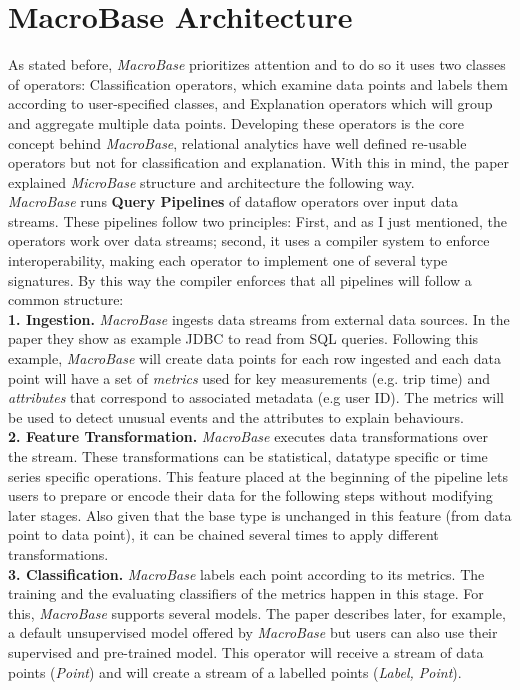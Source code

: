 \documentclass[11pt, titlepage]{article}
\begin{document}
	\section{MacroBase Architecture}
	\begin{flushleft}
		As stated before, \textit{MacroBase} prioritizes attention and to do so it uses two classes of operators: Classification operators, which examine data points and labels them according to user-specified classes, and Explanation operators which will group and aggregate multiple data points. Developing these operators is the core concept behind \textit{MacroBase}, relational analytics have well defined re-usable operators but not for classification and explanation. With this in mind, the paper explained \textit{MicroBase} structure and architecture the following way.
		\\\textit{MacroBase} runs \textbf{Query Pipelines} of dataflow operators over input data streams. These pipelines follow two principles: First, and as I just mentioned, the operators work over data streams; second, it uses a compiler system to enforce interoperability, making each operator to implement one of several type signatures. By this way the compiler enforces that all pipelines will follow a common structure:
		\\\textbf{1. Ingestion.} \textit{MacroBase} ingests data streams from external data sources. In the paper they show as example JDBC to read from SQL queries. Following this example, \textit{MacroBase} will create data points for each row ingested and each data point will have a set of \textit{metrics} used for key measurements (e.g. trip time) and \textit{attributes} that correspond to associated metadata (e.g user ID). The metrics will be used to detect unusual events and the attributes to explain behaviours.
		\\\textbf{2. Feature Transformation.} \textit{MacroBase} executes data transformations over the stream. These transformations can be statistical, datatype specific or time series specific operations. This feature placed at the beginning of the pipeline lets users to prepare or encode their data for the following steps without modifying later stages. Also given that the base type is unchanged in this feature (from data point to data point), it can be chained several times to apply different transformations.
		\\\textbf{3. Classification.} \textit{MacroBase} labels each point according to its metrics. The training and the evaluating classifiers of the metrics happen in this stage. For this, \textit{MacroBase} supports several models. The paper describes later, for example, a default unsupervised model offered by \textit{MacroBase}  but users can also use their supervised and pre-trained model. This operator will receive a stream of data points (\textit{Point}) and will create a stream of a labelled points (\textit{Label, Point}).

\end{flushleft}
\end{document}
